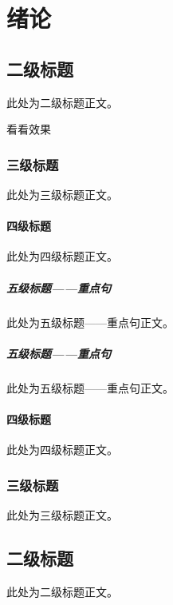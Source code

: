 
\chapter{绪论} 
\section{二级标题}
此处为二级标题正文。

看看效果
\subsection{三级标题}
此处为三级标题正文。
\subsubsection{四级标题}
此处为四级标题正文。
\paragraph{五级标题——重点句}
此处为五级标题——重点句正文。
\paragraph{五级标题——重点句}
此处为五级标题——重点句正文。
\subsubsection{四级标题}
此处为四级标题正文。
\subsection{三级标题}
此处为三级标题正文。
\section{二级标题}
此处为二级标题正文。

